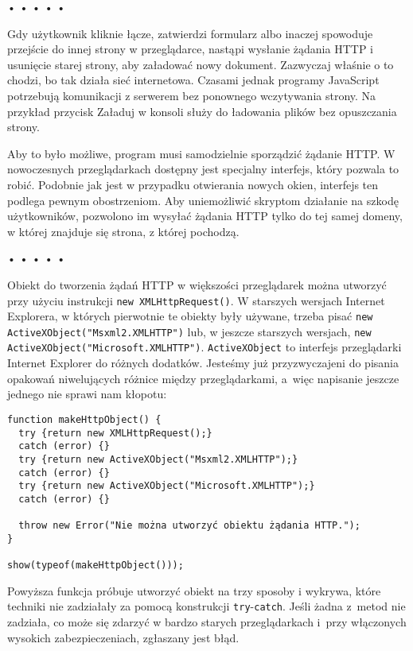 \begin{center}
• • • • •
\end{center}

  
Gdy użytkownik kliknie łącze, zatwierdzi formularz albo inaczej spowoduje przejście do innej strony w przeglądarce, nastąpi wysłanie żądania HTTP i usunięcie starej strony, aby załadować nowy dokument. Zazwyczaj właśnie o to chodzi, bo tak działa sieć internetowa. Czasami jednak programy JavaScript potrzebują komunikacji z serwerem bez ponownego wczytywania strony. Na przykład przycisk Załaduj w konsoli służy do ładowania plików bez opuszczania strony.

  
Aby to było możliwe, program musi samodzielnie sporządzić żądanie HTTP. W nowoczesnych przeglądarkach dostępny jest specjalny interfejs, który pozwala to robić. Podobnie jak jest w przypadku otwierania nowych okien, interfejs ten podlega pewnym obostrzeniom. Aby uniemożliwić skryptom działanie na szkodę użytkowników, pozwolono im wysyłać żądania HTTP tylko do tej samej domeny, w której znajduje się strona, z której pochodzą.



\begin{center}
• • • • •
\end{center}

  
Obiekt do tworzenia żądań HTTP w większości przeglądarek można utworzyć przy użyciu instrukcji \texttt{new XMLHttpRequest()}. W starszych wersjach Internet Explorera, w których pierwotnie te obiekty były używane, trzeba pisać \texttt{new ActiveXObject("Msxml2.XMLHTTP")} lub, w jeszcze starszych wersjach, \texttt{new ActiveXObject("Microsoft.XMLHTTP")}. \texttt{ActiveXObject} to interfejs przeglądarki Internet Explorer do różnych dodatków. Jesteśmy już przyzwyczajeni do pisania opakowań niwelujących różnice między przeglądarkami, a~więc napisanie jeszcze jednego nie sprawi nam kłopotu:

  
\begin{verbatim} 
function makeHttpObject() {
  try {return new XMLHttpRequest();}
  catch (error) {}
  try {return new ActiveXObject("Msxml2.XMLHTTP");}
  catch (error) {}
  try {return new ActiveXObject("Microsoft.XMLHTTP");}
  catch (error) {}

  throw new Error("Nie można utworzyć obiektu żądania HTTP.");
}

show(typeof(makeHttpObject()));
\end{verbatim}
  
Powyższa funkcja próbuje utworzyć obiekt na trzy sposoby i wykrywa, które techniki nie zadziałały za pomocą konstrukcji \texttt{try}-\texttt{catch}. Jeśli żadna z~metod nie zadziała, co może się zdarzyć w bardzo starych przeglądarkach i~przy włączonych wysokich zabezpieczeniach, zgłaszany jest błąd.

